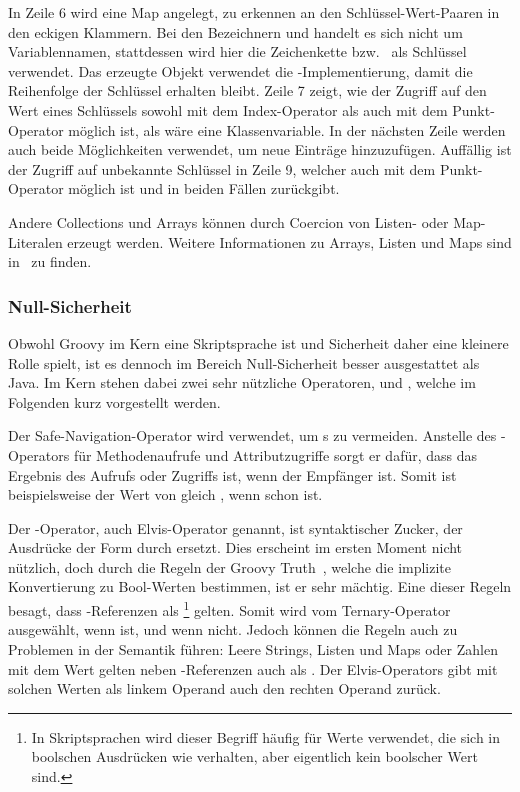 \documentclass[a4paper]{article}
\begin{document}
In Zeile 6 wird eine Map angelegt, zu erkennen an den Schlüssel-Wert-Paaren in den eckigen Klammern.
Bei den Bezeichnern  und  handelt es sich nicht um Variablennamen, stattdessen wird hier die Zeichenkette  bzw.~ als Schlüssel verwendet.
Das erzeugte Objekt verwendet die -Implementierung, damit die Reihenfolge der Schlüssel erhalten bleibt.
Zeile 7 zeigt, wie der Zugriff auf den Wert eines Schlüssels sowohl mit dem Index-Operator als auch mit dem Punkt-Operator möglich ist, als wäre  eine Klassenvariable.
In der nächsten Zeile werden auch beide Möglichkeiten verwendet, um neue Einträge hinzuzufügen.
Auffällig ist der Zugriff auf unbekannte Schlüssel in Zeile 9, welcher auch mit dem Punkt-Operator möglich ist und in beiden Fällen  zurückgibt.

Andere Collections und Arrays können durch Coercion von Listen- oder Map-Literalen erzeugt werden.
Weitere Informationen zu Arrays, Listen und Maps sind in~\cite[Abs.~1.1.7.-1.1.9.]{groovy-lang:documentation} zu finden.

\subsubsection{Null-Sicherheit}

Obwohl Groovy im Kern eine Skriptsprache ist und Sicherheit daher eine kleinere Rolle spielt, ist es dennoch im Bereich Null-Sicherheit besser ausgestattet als Java.
Im Kern stehen dabei zwei sehr nützliche Operatoren,  und , welche im Folgenden kurz vorgestellt werden.

Der Safe-Navigation-Operator  wird verwendet, um s zu vermeiden.
Anstelle des -Operators für Methodenaufrufe und Attributzugriffe sorgt er dafür, dass das Ergebnis des Aufrufs oder Zugriffs  ist, wenn der Empfänger  ist.
Somit ist beispielsweise der Wert von  gleich , wenn  schon  ist.

Der -Operator, auch Elvis-Operator genannt, ist syntaktischer Zucker, der Ausdrücke der Form  durch  ersetzt.
Dies erscheint im ersten Moment nicht nützlich, doch durch die Regeln der Groovy Truth~\cite[Abs.~1.6.5.]{groovy-lang:documentation}, welche die implizite Konvertierung zu Bool-Werten bestimmen, ist er sehr mächtig.
Eine dieser Regeln besagt, dass -Referenzen als \footnote{In Skriptsprachen wird dieser Begriff häufig für Werte verwendet, die sich in boolschen Ausdrücken wie  verhalten, aber eigentlich kein boolscher Wert sind.} gelten.
Somit wird  vom Ternary-Operator ausgewählt, wenn   ist, und  wenn nicht.
Jedoch können die Regeln auch zu Problemen in der Semantik führen:
Leere Strings, Listen und Maps oder Zahlen mit dem Wert  gelten neben -Referenzen auch als .
Der Elvis-Operators gibt mit solchen Werten als linkem Operand auch den rechten Operand zurück.
\end{document}
